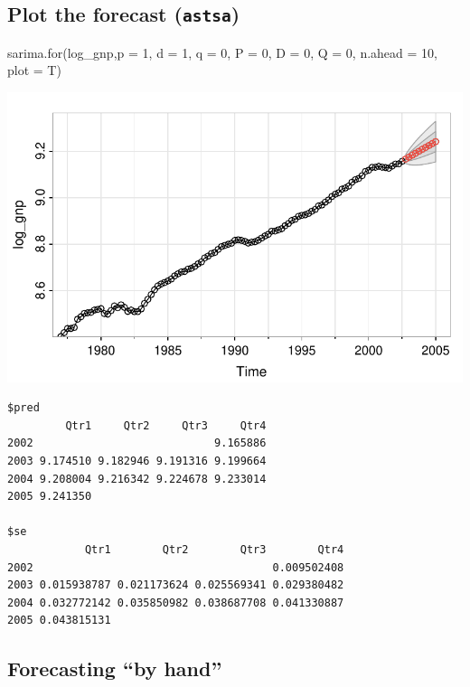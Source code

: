 \documentclass[
  letterpaper,
  DIV=11,
  numbers=noendperiod]{scrartcl}
\newenvironment{Shaded}{\begin{snugshade}}{\end{snugshade}}
\newcommand{\AttributeTok}[1]{\textcolor[rgb]{0.40,0.45,0.13}{#1}}
\newcommand{\DecValTok}[1]{\textcolor[rgb]{0.68,0.00,0.00}{#1}}
\newcommand{\FunctionTok}[1]{\textcolor[rgb]{0.28,0.35,0.67}{#1}}
\newcommand{\NormalTok}[1]{\textcolor[rgb]{0.00,0.23,0.31}{#1}}
\begin{document}
\subsection{\texorpdfstring{Plot the forecast
(\texttt{astsa})}{Plot the forecast (astsa)}}\label{plot-the-forecast-astsa}

\begin{Shaded}
\begin{Highlighting}[]
\FunctionTok{sarima.for}\NormalTok{(log\_gnp,}\AttributeTok{p =} \DecValTok{1}\NormalTok{, }\AttributeTok{d =} \DecValTok{1}\NormalTok{, }\AttributeTok{q =} \DecValTok{0}\NormalTok{, }\AttributeTok{P =} \DecValTok{0}\NormalTok{, }\AttributeTok{D =} \DecValTok{0}\NormalTok{, }\AttributeTok{Q =} \DecValTok{0}\NormalTok{, }\AttributeTok{n.ahead =} \DecValTok{10}\NormalTok{, }\AttributeTok{plot =}\NormalTok{ T)}
\end{Highlighting}
\end{Shaded}

\includegraphics{Lecture12_files/figure-pdf/unnamed-chunk-9-1.pdf}

\begin{verbatim}
$pred
         Qtr1     Qtr2     Qtr3     Qtr4
2002                            9.165886
2003 9.174510 9.182946 9.191316 9.199664
2004 9.208004 9.216342 9.224678 9.233014
2005 9.241350                           

$se
            Qtr1        Qtr2        Qtr3        Qtr4
2002                                     0.009502408
2003 0.015938787 0.021173624 0.025569341 0.029380482
2004 0.032772142 0.035850982 0.038687708 0.041330887
2005 0.043815131                                    
\end{verbatim}

\subsection{Forecasting ``by hand''}\label{forecasting-by-hand}
\end{document}
